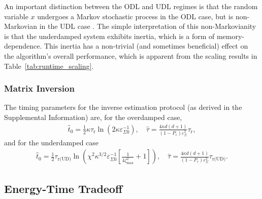 \documentclass[prx,onecolumn,floatfix,longbibliography,notitlepage, nofootinbib,12pt]{revtex4-2}
\begin{document}
An important distinction between the ODL and UDL regimes is that the random variable $x$ undergoes a Markov stochastic process in the ODL case, but is non-Markovian in the UDL case \cite{doerries2021correlation,h1989colored}. The simple interpretation of this non-Markovianity is that the underdamped system exhibits inertia, which is a form of memory-dependence. This inertia has a non-trivial (and sometimes beneficial) effect on the algorithm's overall performance, which is apparent from the scaling results in Table~\ref{tab:runtime_scaling}.





\subsubsection{Matrix Inversion}

The timing parameters for the inverse estimation protocol (as derived in the Supplemental Information) are, for the overdamped case,
\begin{align}
\label{eq:t0-tau-inverse-odl}
\widehat{t}_0 =
 \frac{1}{2} \kappa \tau_\text{r}\ln\left(2\kappa\varepsilon_{\Sigma 0}^{-1}\right),\quad
    \widehat{\tau} = \frac{4 \kappa d(d+1)}{(1-P_\varepsilon)\varepsilon_\Sigma^2}\tau_\text{r},
\end{align}
and for the underdamped case
\begin{align}
\label{eq:t0-tau-inverse-udl}
\widehat{t}_0 = \frac{1}{2} \tau_\text{r(UD)}\ln\left(\chi^2 \kappa^{3/2}\varepsilon_{\Sigma0}^{-1}\left[\frac{1}{4\zeta_\text{max}^{2}}+1\right]\right),\quad
    \widehat{\tau} =\frac{4 \kappa d(d+1)}{(1-P_\varepsilon)\varepsilon_\Sigma^2}\tau_\text{r(UD)}.
\end{align}




\subsection{Energy-Time Tradeoff}
\end{document}
